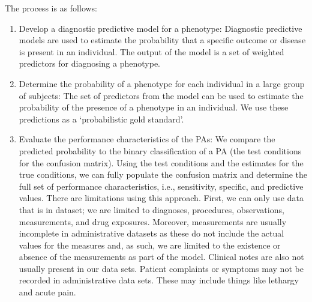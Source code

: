 \documentclass[11pt]{book}
\theoremstyle{definition}
\theoremstyle{definition}
\theoremstyle{definition}
\theoremstyle{remark}
\begin{document}
The process is as follows:

\begin{enumerate}
\def\labelenumi{\arabic{enumi})}
\item
  Develop a diagnostic predictive model for a phenotype: Diagnostic predictive models are used to estimate the probability that a specific outcome or disease is present in an individual.\citep{moons_transparent_2015} The output of the model is a set of weighted predictors for diagnosing a phenotype.
\item
  Determine the probability of a phenotype for each individual in a large group of subjects: The set of predictors from the model can be used to estimate the probability of the presence of a phenotype in an individual. We use these predictions as a `probabilistic gold standard'.
\item
  Evaluate the performance characteristics of the PAs: We compare the predicted probability to the binary classification of a PA (the test conditions for the confusion matrix). Using the test conditions and the estimates for the true conditions, we can fully populate the confusion matrix and determine the full set of performance characteristics, i.e., sensitivity, specific, and predictive values.
  There are limitations using this approach. First, we can only use data that is in dataset; we are limited to diagnoses, procedures, observations, measurements, and drug exposures. Moreover, measurements are usually incomplete in administrative datasets as these do not include the actual values for the measures and, as such, we are limited to the existence or absence of the measurements as part of the model. Clinical notes are also not usually present in our data sets. Patient complaints or symptoms may not be recorded in administrative data sets. These may include things like lethargy and acute pain.

\end{enumerate}
\end{document}
